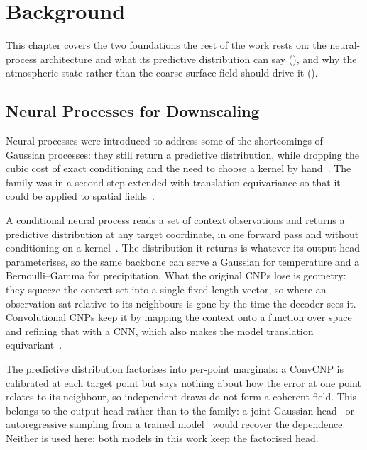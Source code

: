 
\chapter{Background}\label{ch:background}

This chapter covers the two foundations the rest of the work rests on: the neural-process
architecture and what its predictive distribution can say (), and why
the atmospheric state rather than the coarse surface field should drive it
().

\section{Neural Processes for Downscaling}\label{sec:bg-neural-processes}

Neural processes were introduced to address some of the shortcomings of Gaussian processes: they still return a predictive distribution, while dropping the cubic cost of exact conditioning and the need to choose a kernel by hand~\cite{garnelo2018cnp}. The family was in a second step extended with translation equivariance so that it could be applied to spatial fields~\cite{gordon2020convcnp}.

A conditional neural process reads a set of context observations and returns a predictive distribution at any target coordinate, in one forward pass and without conditioning on a kernel~\cite{garnelo2018cnp}. The distribution it returns is whatever its output head parameterises, so the same backbone can serve a Gaussian for temperature and a Bernoulli--Gamma for precipitation. What the original CNPs lose is geometry: they squeeze the context set into a single fixed-length vector, so where an observation sat relative to its neighbours is gone by the time the decoder sees it. Convolutional CNPs keep it by mapping the context onto a function over space and refining that with a CNN, which also makes the model translation equivariant~\cite{gordon2020convcnp}.

The predictive distribution factorises into per-point marginals: a ConvCNP is calibrated at each target point but says nothing about how the error at one point relates to its neighbour, so independent draws do not form a coherent field. This belongs to the output head rather than to the family: a joint Gaussian head~\cite{andersson2023convgnp} or autoregressive sampling from a trained model~\cite{bruinsma2023arcnp} would recover the dependence. Neither is used here; both models in this work keep the factorised head.

